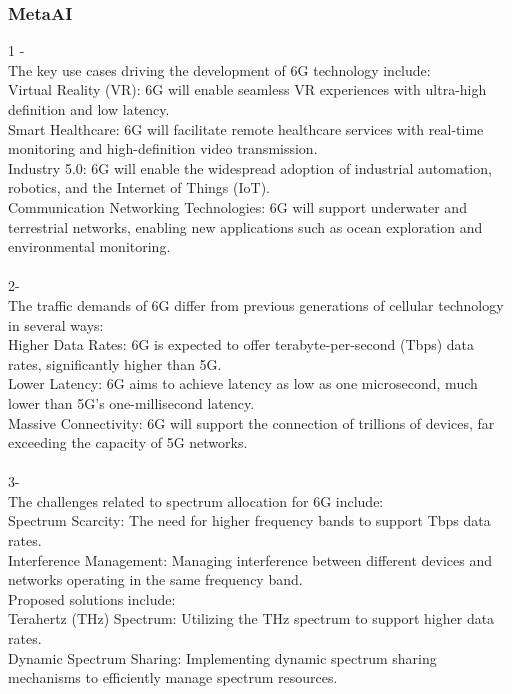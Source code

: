 \subsubsection{MetaAI}
\begin{tcolorbox}[breakable]
1 -\\
The key use cases driving the development of 6G technology include:\\
Virtual Reality (VR): 6G will enable seamless VR experiences with ultra-high definition and low latency.\\
Smart Healthcare: 6G will facilitate remote healthcare services with real-time monitoring and high-definition video transmission.\\
Industry 5.0: 6G will enable the widespread adoption of industrial automation, robotics, and the Internet of Things (IoT).\\
Communication Networking Technologies: 6G will support underwater and terrestrial networks, enabling new applications such as ocean exploration and environmental monitoring.\\
\\
2-\\
The traffic demands of 6G differ from previous generations of cellular technology in several ways:\\
Higher Data Rates: 6G is expected to offer terabyte-per-second (Tbps) data rates, significantly higher than 5G.\\
Lower Latency: 6G aims to achieve latency as low as one microsecond, much lower than 5G's one-millisecond latency.\\
Massive Connectivity: 6G will support the connection of trillions of devices, far exceeding the capacity of 5G networks.\\
\\
3-\\
The challenges related to spectrum allocation for 6G include:\\
Spectrum Scarcity: The need for higher frequency bands to support Tbps data rates.\\
Interference Management: Managing interference between different devices and networks operating in the same frequency band.\\
Proposed solutions include:\\
Terahertz (THz) Spectrum: Utilizing the THz spectrum to support higher data rates.\\
Dynamic Spectrum Sharing: Implementing dynamic spectrum sharing mechanisms to efficiently manage spectrum resources.\\

\end{tcolorbox}
